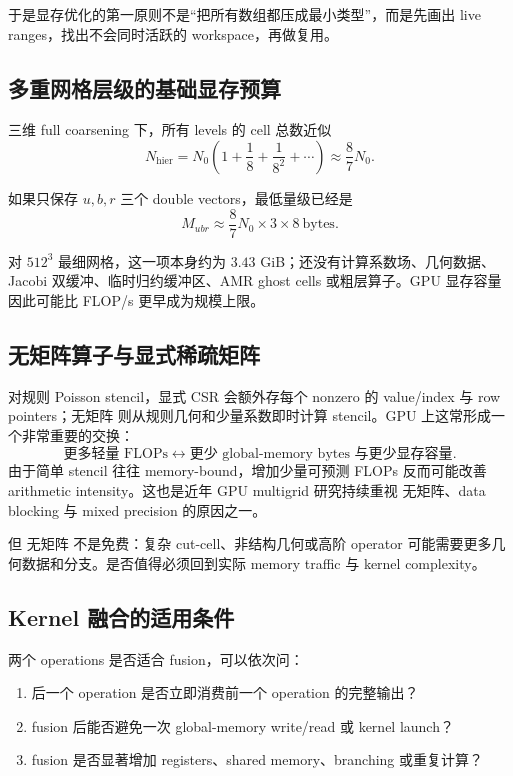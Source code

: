于是显存优化的第一原则不是“把所有数组都压成最小类型”，而是先画出 live ranges，找出不会同时活跃的 workspace，再做复用。

\subsection{多重网格层级的基础显存预算}

三维 full coarsening 下，所有 levels 的 cell 总数近似
\begin{equation}
N_{\mathrm{hier}}
=N_0\left(1+\frac18+\frac1{8^2}+\cdots\right)
\approx\frac87N_0.
\label{eq:gpu-hierarchy-size}
\end{equation}

如果只保存 $u,b,r$ 三个 double vectors，最低量级已经是
\begin{equation}
M_{ubr}
\approx \frac87N_0\times3\times8\ \text{bytes}.
\label{eq:gpu-basic-memory-budget}
\end{equation}

对 $512^3$ 最细网格，这一项本身约为 $3.43$ GiB；还没有计算系数场、几何数据、Jacobi 双缓冲、临时归约缓冲区、AMR ghost cells 或粗层算子。GPU 显存容量因此可能比 FLOP/s 更早成为规模上限。

\subsection{无矩阵算子与显式稀疏矩阵}

对规则 Poisson stencil，显式 CSR 会额外存每个 nonzero 的 value/index 与 row pointers；无矩阵 则从规则几何和少量系数即时计算 stencil。GPU 上这常形成一个非常重要的交换：
\[
\boxed{
\text{更多轻量 FLOPs}
\leftrightarrow
\text{更少 global-memory bytes 与更少显存容量}.
}
\]
由于简单 stencil 往往 memory-bound，增加少量可预测 FLOPs 反而可能改善 arithmetic intensity。这也是近年 GPU multigrid 研究持续重视 无矩阵、data blocking 与 mixed precision 的原因之一\cite{antepara2024brick,stokesgpu2025}。

但 无矩阵 不是免费：复杂 cut-cell、非结构几何或高阶 operator 可能需要更多几何数据和分支。是否值得必须回到实际 memory traffic 与 kernel complexity。

\subsection{Kernel 融合的适用条件}

两个 operations 是否适合 fusion，可以依次问：
\begin{enumerate}
\item 后一个 operation 是否立即消费前一个 operation 的完整输出？
\item fusion 后能否避免一次 global-memory write/read 或 kernel launch？
\item fusion 是否显著增加 registers、shared memory、branching 或重复计算？
\end{enumerate}

